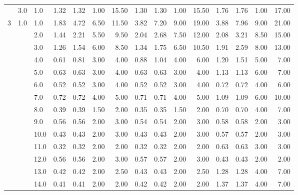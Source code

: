 \begin{tabular}{lllrrrrrrrrrrrr}
     & 3.0 & 1.0  &       1.32 &      1.32 & 1.00 &  15.50 &       1.30 &      1.30 & 1.00 &  15.50 &       1.76 &      1.76 & 1.00 &  17.00 \\
3 & 1.0 & 1.0  &       1.83 &      4.72 & 6.50 &  11.50 &       3.82 &      7.20 & 9.00 &  19.00 &       3.88 &      7.96 & 9.00 &  21.00 \\
     &     & 2.0  &       1.44 &      2.21 & 5.50 &   9.50 &       2.04 &      2.68 & 7.50 &  12.00 &       2.08 &      3.21 & 8.50 &  15.00 \\
     &     & 3.0  &       1.26 &      1.54 & 6.00 &   8.50 &       1.34 &      1.75 & 6.50 &  10.50 &       1.91 &      2.59 & 8.00 &  13.00 \\
     &     & 4.0  &       0.61 &      0.81 & 3.00 &   4.00 &       0.88 &      1.04 & 4.00 &   6.00 &       1.20 &      1.51 & 5.00 &   7.00 \\
     &     & 5.0  &       0.63 &      0.63 & 3.00 &   4.00 &       0.63 &      0.63 & 3.00 &   4.00 &       1.13 &      1.13 & 6.00 &   7.00 \\
     &     & 6.0  &       0.52 &      0.52 & 3.00 &   4.00 &       0.52 &      0.52 & 3.00 &   4.00 &       0.72 &      0.72 & 4.00 &   6.00 \\
     &     & 7.0  &       0.72 &      0.72 & 4.00 &   5.00 &       0.71 &      0.71 & 4.00 &   5.00 &       1.09 &      1.09 & 6.00 &  10.00 \\
     &     & 8.0  &       0.39 &      0.39 & 1.50 &   2.00 &       0.35 &      0.35 & 1.50 &   2.00 &       0.70 &      0.70 & 4.00 &   7.00 \\
     &     & 9.0  &       0.56 &      0.56 & 2.00 &   3.00 &       0.54 &      0.54 & 2.00 &   3.00 &       0.58 &      0.58 & 2.00 &   3.00 \\
     &     & 10.0 &       0.43 &      0.43 & 2.00 &   3.00 &       0.43 &      0.43 & 2.00 &   3.00 &       0.57 &      0.57 & 2.00 &   3.00 \\
     &     & 11.0 &       0.32 &      0.32 & 2.00 &   2.00 &       0.32 &      0.32 & 2.00 &   2.00 &       0.63 &      0.63 & 3.00 &   3.00 \\
     &     & 12.0 &       0.56 &      0.56 & 2.00 &   3.00 &       0.57 &      0.57 & 2.00 &   3.00 &       0.43 &      0.43 & 2.00 &   2.00 \\
     &     & 13.0 &       0.42 &      0.42 & 2.00 &   2.50 &       0.43 &      0.43 & 2.00 &   2.50 &       1.28 &      1.28 & 4.00 &   7.00 \\
     &     & 14.0 &       0.41 &      0.41 & 2.00 &   2.00 &       0.42 &      0.42 & 2.00 &   2.00 &       1.37 &      1.37 & 4.00 &   7.00 \\

\end{tabular}
